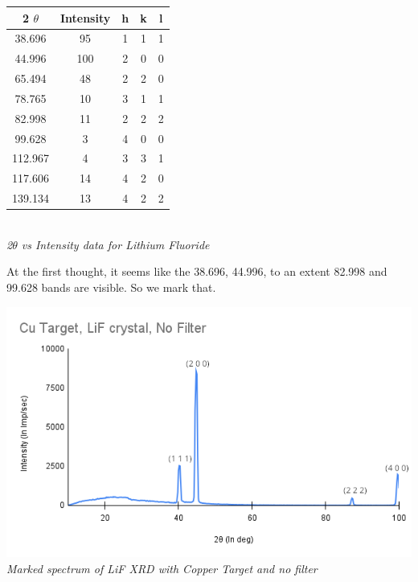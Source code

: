 \documentclass[]{report}[12 pt]
\begin{document}
		\begin{center}
		\begin{tabular}{|c|c|c|c|c|}
		\hline
		2 $\theta$ & Intensity & h & k & l \\
		\hline
		38.696 & 95 & 1 & 1 & 1 \\
		\hline
		44.996 & 100 & 2 & 0 & 0 \\
		\hline
		65.494 & 48 & 2 & 2 & 0 \\
		\hline
		78.765 & 10 & 3 & 1 & 1 \\
		\hline
		82.998 & 11 & 2 & 2 & 2 \\
		\hline
		99.628 & 3 & 4 & 0 & 0 \\
		\hline
		112.967 & 4 & 3 & 3 & 1 \\
		\hline
		117.606 & 14 & 4 & 2 & 0 \\
		\hline
		139.134 & 13 & 4 & 2 & 2 \\
		\hline
	\end{tabular}\\
	\textit{2$\theta$ vs Intensity data for Lithium Fluoride}
	\end{center}
	At the first thought, it seems like the 38.696, 44.996, to an extent 82.998 and 99.628 bands are visible. So we mark that.
	\begin{center}
		\includegraphics[width=10 cm]{a1.png}\\
		\textit{Marked spectrum of LiF XRD with Copper Target and no filter}
	\end{center}
\end{document}
